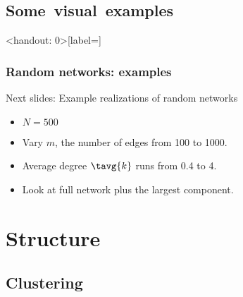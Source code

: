 \subsection{Some\ visual\ examples}

\begin{frame}<handout: 0>[label=]
  \frametitle{Random networks: examples}

  \begin{block}{Next slides:}
    Example realizations of random networks
    \begin{itemize}
    \item<2-> $N=500$
    \item<3-> Vary $m$, the number of edges from 100 to 1000.
    \item<4-> Average degree $\tavg{k}$ runs from 0.4 to 4.
    \item<5-> Look at full network plus the largest component.
    \end{itemize}
  \end{block}

\end{frame}












\section{Structure}

\subsection{Clustering}

